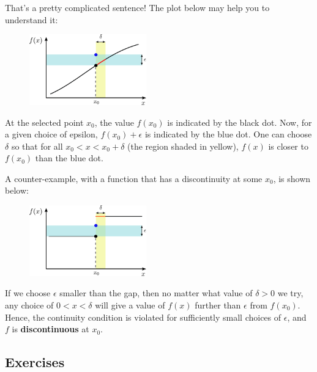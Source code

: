 \documentclass[10pt,a4paper]{article}
\begin{document}
\noindent
That's a pretty complicated sentence! The plot below may help you to
understand it:

\begin{figure}[ht]
  \centering\includegraphics[width=0.45\textwidth]{continuity}
\end{figure}

\noindent
At the selected point $x_0$, the value $f(x_0)$ is indicated by the
black dot.  Now, for a given choice of epsilon, $f(x_0)+\epsilon$ is
indicated by the blue dot.  One can choose $\delta$ so that for all
$x_0 < x < x_0 + \delta$ (the region shaded in yellow), $f(x)$ is
closer to $f(x_0)$ than the blue dot.

A counter-example, with a function that has a discontinuity at some
$x_0$, is shown below:

\begin{figure}[ht]
  \centering\includegraphics[width=0.45\textwidth]{discontinuity}
\end{figure}

\noindent
If we choose $\epsilon$ smaller than the gap, then no matter what
value of $\delta > 0$ we try, any choice of $0 < x < \delta$ will give
a value of $f(x)$ further than $\epsilon$ from $f(x_0)$. Hence, the
continuity condition is violated for sufficiently small choices of
$\epsilon$, and $f$ is \textbf{discontinuous} at $x_0$.

\subsection{Exercises}\label{exercises}
\end{document}
